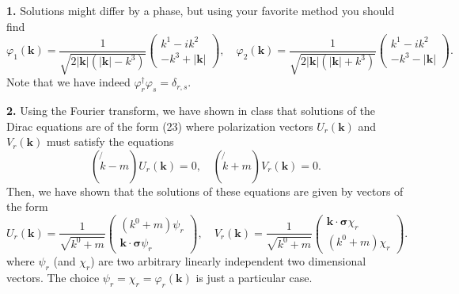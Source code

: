 \textbf{1.} Solutions might differ by a phase, but using your favorite method you should find
\begin{equation}
    \varphi_1(\mathbf{k}) = \frac{1}{\sqrt{2|\mathbf{k}|(|\mathbf{k}|-k^3)}} \begin{pmatrix} k^1-ik^2 \\ -k^3+|\mathbf{k}| \end{pmatrix}, \quad \varphi_2(\mathbf{k}) = \frac{1}{\sqrt{2|\mathbf{k}|(|\mathbf{k}|+k^3)}} \begin{pmatrix} k^1-ik^2 \\ -k^3-|\mathbf{k}| \end{pmatrix}.
\end{equation}
Note that we have indeed $\varphi^\dagger_r \varphi_s = \delta_{r,s}$.

\textbf{2.} Using the Fourier transform, we have shown in class that solutions of the Dirac equations are of the form (23) where polarization vectors $U_r(\mathbf{k})$ and $V_r(\mathbf{k})$ must satisfy the equations
\begin{equation}
    (\not{k}-m)U_r(\mathbf{k}) = 0, \quad (\not{k}+m)V_r(\mathbf{k}) = 0.
\end{equation}
Then, we have shown that the solutions of these equations are given by vectors of the form
\begin{equation}
    U_r(\mathbf{k}) = \frac{1}{\sqrt{k^0+m}} \begin{pmatrix} (k^0+m)\psi_r \\ \mathbf{k}\cdot\boldsymbol{\sigma}\psi_r \end{pmatrix}, \quad V_r(\mathbf{k}) = \frac{1}{\sqrt{k^0+m}} \begin{pmatrix} \mathbf{k}\cdot\boldsymbol{\sigma}\chi_r \\ (k^0+m)\chi_r \end{pmatrix}.
\end{equation}
where $\psi_r$ (and $\chi_r$) are two arbitrary linearly independent two dimensional vectors. The choice $\psi_r = \chi_r = \varphi_r(\mathbf{k})$ is just a particular case.

